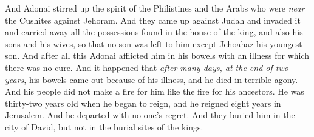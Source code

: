 \begin{biblechapter}
\verse And Adonai stirred up the spirit of the Philistines and the Arabs who were \textit{near} the Cushites against Jehoram.
\verse And they came up against Judah and invaded it and carried away all the possessions found in the house of the king, and also his sons and his wives, so that no son was left to him except Jehoahaz his youngest son.
\verse And after all this Adonai afflicted him in his bowels with an illness for which there was no cure.
\verse And it happened that \textit{after many days, at the end of two years}, his bowels came out because of his illness, and he died in terrible agony. And his people did not make a fire for him like the fire for his ancestors.
\verse He was thirty-two years old when he began to reign, and he reigned eight years in Jerusalem. And he departed with no one’s regret. And they buried him in the city of David, but not in the burial sites of the kings.
\end{biblechapter}

